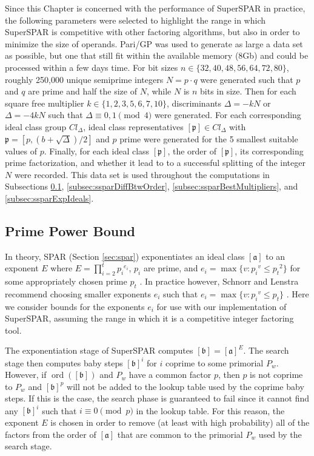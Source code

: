 \documentclass{ucalgthes1}
\theoremstyle{definition}
\DeclareMathOperator{\ord}{ord}
\newcommand{\ideal}{\mathfrak}
\newcommand{\idealclass}[1]{\left[ \ideal #1 \right]}
\newcommand{\aclass}{\idealclass a}
\newcommand{\bclass}{\idealclass b}
\begin{document}
Since this Chapter is concerned with the performance of SuperSPAR in practice, the following parameters were selected to highlight the range in which SuperSPAR is competitive with other factoring algorithms, but also in order to minimize the size of operands.  Pari/GP was used to generate as large a data set as possible, but one that still fit within the available memory (8Gb) and could be processed within a few days time.  For bit sizes $n \in \{32, 40, 48, 56, 64, 72, 80\}$, roughly 250,000 unique semiprime integers $N = p \cdot q$ were generated such that $p$ and $q$ are prime and half the size of $N$, while $N$ is $n$ bits in size.  Then for each square free multiplier $k \in \{1, 2, 3, 5, 6, 7, 10\}$, discriminants $\Delta = -kN$ or $\Delta = -4kN$ such that $\Delta \equiv 0, 1 \pmod 4$ were generated.  For each corresponding ideal class group $Cl_\Delta$, ideal class representatives $\idealclass p \in Cl_\Delta$ with $\ideal p = [p, (b+\sqrt\Delta)/2]$ and $p$ prime were generated for the 5 smallest suitable values of $p$.  Finally, for each ideal class $\idealclass p$, the order of $\idealclass p$, its corresponding prime factorization, and whether it lead to to a successful splitting of the integer $N$ were recorded.  This data set is used throughout the computations in Subsections \ref{subsec:ssparPrimePowerBound}, \ref{subsec:ssparDiffBtwOrder}, \ref{subsec:ssparBestMultipliers}, and \ref{subsec:ssparExpIdeals}.



\subsection{Prime Power Bound}
\label{subsec:ssparPrimePowerBound}

In theory, SPAR (Section \ref{sec:spar}) exponentiates an ideal class $\aclass$ to an exponent $E$ where $E = \prod_{i=2}^t {p_i}^{e_i}$, $p_i$ are prime, and $e_i = \max \{ v : {p_i}^v \le {p_t}^2 \}$ for some appropriately chosen prime $p_t$ \cite[p.290]{Schnorr1984}.  In practice however, Schnorr and Lenstra recommend choosing smaller exponents $e_i$ such that $e_i = \max \{ v : {p_i}^v \le p_t \}$ \cite[p.293]{Schnorr1984}.  Here we consider bounds for the exponents $e_i$ for use with our implementation of SuperSPAR, assuming the range in which it is a competitive integer factoring tool.

The exponentiation stage of SuperSPAR computes $\bclass = \aclass ^E$.  The search stage then computes baby steps $\bclass^i$ for $i$ coprime to some primorial $P_w$.  However, if $\ord(\bclass)$ and $P_w$ have a common factor $p$, then $p$ is not coprime to $P_w$ and $\bclass^p$ will not be added to the lookup table used by the coprime baby steps.  If this is the case, the search phase is guaranteed to fail since it cannot find any $\bclass^i$ such that $i \equiv 0 \pmod p$ in the lookup table.  For this reason, the exponent $E$ is chosen in order to remove (at least with high probability) all of the factors from the order of $\aclass$ that are common to the primorial $P_w$ used by the search stage.
\end{document}
